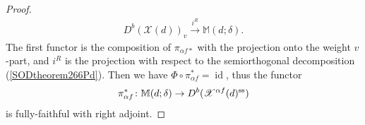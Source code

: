 \documentclass [11pt,oneside,a4paper,mathscr]{amsart}
\newtheorem{prop}[thm]{Proposition}
\theoremstyle{definition}
\newcommand{\X}{\mathscr{X}}
\newcommand{\id}{\operatorname{id}}
\begin{document}
\begin{proof}
\begin{align*}
        D^b(\X(d))_v \stackrel{i^R}{\to} \mathbb{M}(d; \delta).
    \end{align*}
    The first functor is the composition of 
    $\pi_{\alpha f\ast}$ with the projection 
    onto the weight $v$-part, and $i^R$ is the 
    projection with respect to the semiorthogonal decomposition (\ref{SODtheorem266Pd}). 
    Then we have $\Phi \circ \pi_{\alpha f}^{\ast}=\id$, thus the functor 
    \begin{align*}
        \pi_{\alpha f}^{\ast} \colon \mathbb{M}(d; \delta) \to D^b(\X^{\alpha f}(d)^{\rm{ss}})
    \end{align*}
    is fully-faithful with right adjoint. 
\end{proof}






%
\end{document}
